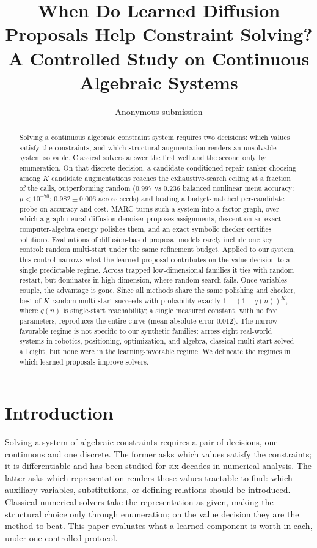 \documentclass[letterpaper]{article} %
\title{When Do Learned Diffusion Proposals Help Constraint Solving?\\
A Controlled Study on Continuous Algebraic Systems}
\author{Anonymous submission}
\date{}
\begin{document}
\maketitle

\begin{abstract}
Solving a continuous algebraic constraint system requires two decisions: which values satisfy
the constraints, and which structural augmentation renders an unsolvable system solvable.
Classical solvers answer the first well and the second only by enumeration. On that discrete
decision, a candidate-conditioned repair ranker choosing among $K$ candidate augmentations
reaches the exhaustive-search ceiling at a fraction of the calls, outperforming random
(0.997 vs 0.236 balanced nonlinear menu accuracy; $p<10^{-70}$; $0.982\pm0.006$ across seeds)
and beating a budget-matched per-candidate probe on accuracy and cost. MARC turns such a
system into a factor graph, over which a graph-neural diffusion denoiser proposes assignments,
descent on an exact computer-algebra energy polishes them, and an exact symbolic checker
certifies solutions. Evaluations of diffusion-based proposal models rarely include one key
control: random multi-start under the same refinement budget. Applied to our system, this
control narrows what the learned proposal contributes on the value decision to a single
predictable regime. Across trapped low-dimensional families it ties with random restart, but
dominates in high dimension, where random search fails. Once variables couple, the advantage
is gone. Since all methods share the same polishing and checker, best-of-$K$ random
multi-start succeeds with probability exactly $1-(1-q(n))^K$, where $q(n)$ is single-start
reachability; a single measured constant, with no free parameters, reproduces the entire curve
(mean absolute error 0.012). The narrow favorable regime is not specific to our synthetic
families: across eight real-world systems in robotics, positioning, optimization, and algebra,
classical multi-start solved all eight, but none were in the learning-favorable regime. We delineate the regimes in which learned proposals improve solvers.
\end{abstract}

\section{Introduction}
\label{sec:intro}

Solving a system of algebraic constraints requires a pair of decisions, one continuous and
one discrete. The former asks which values satisfy the constraints; it is differentiable and
has been studied for six decades in numerical analysis. The latter asks which representation
renders those values tractable to find: which auxiliary variables, substitutions, or defining
relations should be introduced. Classical numerical solvers take the representation as given,
making the structural choice only through enumeration; on the value decision they are the
method to beat. This paper evaluates what a learned component is worth in each, under one
controlled protocol.
\end{document}
